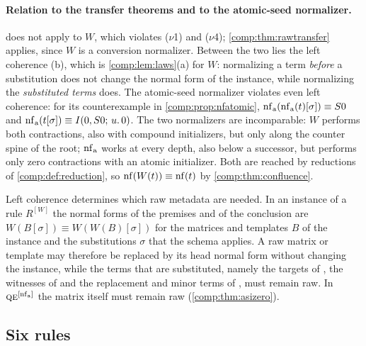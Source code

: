 \paragraph{Relation to the transfer theorems and to the atomic-seed
normalizer.}
 does not apply to $W$, which violates ($\nu$1) and
($\nu$4); \cref{comp:thm:rawtransfer} applies, since $W$ is a conversion
normalizer. Between the two lies the left coherence (b), which is
\cref{comp:lem:laws}(a) for $W$: normalizing a term \emph{before} a
substitution does not change the normal form of the instance, while
normalizing the \emph{substituted terms} does. The atomic-seed normalizer
violates even left coherence: for its counterexample in
\cref{comp:prop:nfatomic},
$\operatorname{nf}_{\mathrm a}(\operatorname{nf}_{\mathrm a}(t)[\sigma])\equiv S0$ and
$\operatorname{nf}_{\mathrm a}(t[\sigma])\equiv I(0,S0;\,u.\,0)$. The two normalizers
are incomparable: $W$ performs both contractions, also with compound
initializers, but only along the counter spine of the root; $\operatorname{nf}_{\mathrm a}$
works at every depth, also below a successor, but performs only zero
contractions with an atomic initializer. Both are reached by reductions of
\cref{comp:def:reduction}, so $\operatorname{nf}(W(t))\equiv\operatorname{nf}(t)$ by
\cref{comp:thm:confluence}.

Left coherence determines which raw metadata are needed. In an instance of a
rule $R^{[W]}$ the normal forms of the premises and of the conclusion are
$W(B[\sigma])\equiv W(W(B)[\sigma])$ for the matrices and templates $B$ of the
instance and the substitutions $\sigma$ that the schema applies. A raw matrix
or template may therefore be replaced by its head normal form without
changing the instance, while the terms that are substituted, namely the
targets of , the witnesses of  and the replacement
and minor terms of , must remain raw. In
$\rulename{QE}^{[\nf_{\mathrm a}]}$ the matrix itself must remain raw
(\cref{comp:thm:asizero}).

\subsection{Six rules}

